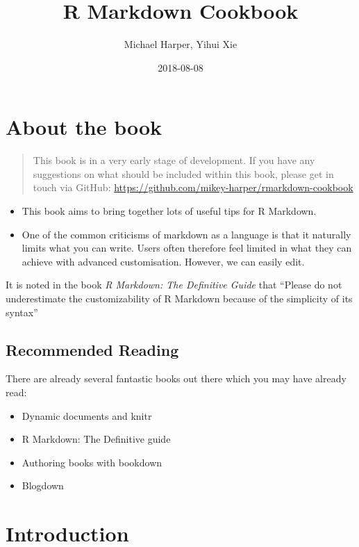 \documentclass[]{book}
\title{R Markdown Cookbook}
\author{Michael Harper, Yihui Xie}
\date{2018-08-08}
\providecommand{\tightlist}{%
  \setlength{\itemsep}{0pt}\setlength{\parskip}{0pt}}
\begin{document}
\maketitle

{
\setcounter{tocdepth}{1}
\tableofcontents
}
\chapter{About the book}\label{about-the-book}

\begin{quote}
This book is in a very early stage of development. If you have any
suggestions on what should be included within this book, please get in
touch via GitHub:
\url{https://github.com/mikey-harper/rmarkdown-cookbook}
\end{quote}

\begin{itemize}
\tightlist
\item
  This book aims to bring together lots of useful tips for R Markdown.
\item
  One of the common criticisms of markdown as a language is that it
  naturally limits what you can write. Users often therefore feel
  limited in what they can achieve with advanced customisation. However,
  we can easily edit.
\end{itemize}

It is noted in the book \emph{R Markdown: The Definitive Guide} that
``Please do not underestimate the customizability of R Markdown because
of the simplicity of its syntax''

\section{Recommended Reading}\label{recommended-reading}

There are already several fantastic books out there which you may have
already read:

\begin{itemize}
\tightlist
\item
  Dynamic documents and knitr
\item
  R Markdown: The Definitive guide
\item
  Authoring books with bookdown
\item
  Blogdown
\end{itemize}

\chapter{Introduction}\label{intro}
\end{document}
